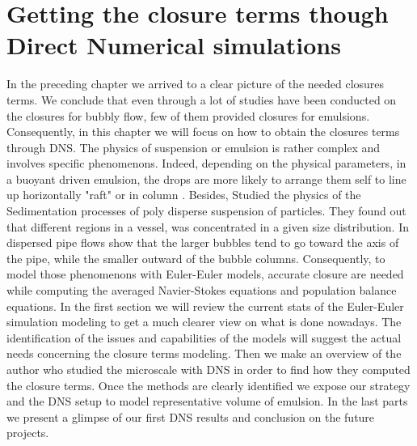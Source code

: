 
\chapter{Getting the closure terms though Direct Numerical simulations}
\label{chap:DNS}

In the preceding chapter we arrived to a clear picture of the needed closures terms.
We conclude that even through a lot of studies have been conducted on the closures for bubbly flow, few of them provided closures for emulsions.
Consequently, in this chapter we will focus on how to obtain the closures terms through DNS. 
The physics of suspension or emulsion is rather complex and involves specific phenomenons.
Indeed, depending on the physical parameters, in a buoyant driven emulsion, the drops are more likely to arrange them self to line up horizontally "raft" or in column \citep{tryggvason2011direct} \citep{guazzelli2011}. 
Besides, \citet{davis1985sedimentation} Studied the physics of the Sedimentation processes of poly disperse suspension of particles. 
They found out that different regions in a vessel, was concentrated in a given size distribution.
In dispersed pipe flows \citet{morel2010comparison} show that the larger bubbles tend to go toward the axis of the pipe, while the smaller outward of the bubble columns.
Consequently, to model those phenomenons with Euler-Euler models, accurate closure are needed while computing the averaged Navier-Stokes equations and population balance equations.
In the first section we will review the current stats of the Euler-Euler simulation modeling to get a much clearer view on what is done nowadays.
The identification of the issues and capabilities of the models will suggest the actual needs concerning the closure terms modeling.
Then we make an overview of the author who studied the microscale with DNS in order to find how they computed the closure terms.
Once the methods are clearly identified we expose our strategy and the DNS setup to model representative volume of emulsion. 
In the last parts we present a glimpse of our first DNS results and conclusion on the future projects. 

